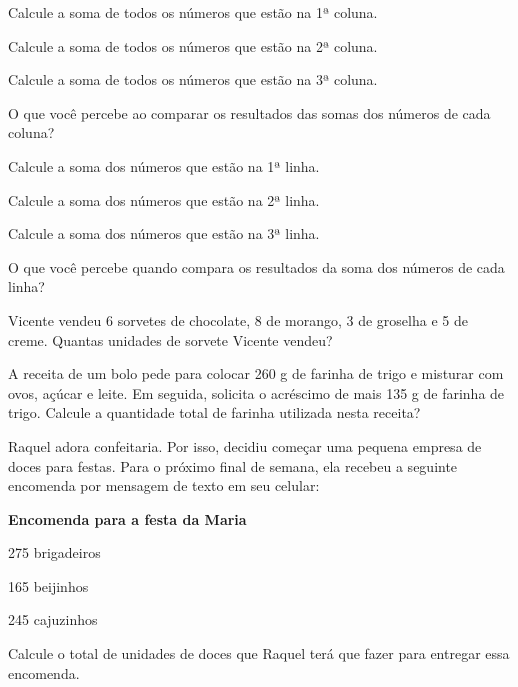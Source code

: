 {}

\startitemize
\item
  Calcule a soma de todos os números que estão na 1ª coluna.
\item
  Calcule a soma de todos os números que estão na 2ª coluna.
\item
  Calcule a soma de todos os números que estão na 3ª coluna.
\item
  O que você percebe ao comparar os resultados das somas dos números de
  cada coluna?
\item
  Calcule a soma dos números que estão na 1ª linha.
\item
  Calcule a soma dos números que estão na 2ª linha.
\item
  Calcule a soma dos números que estão na 3ª linha.
\item
  O que você percebe quando compara os resultados da soma dos números de
  cada linha?
\stopitemize

\subsubsubsection[reference={section-4}]

Vicente vendeu 6 sorvetes de chocolate, 8 de morango, 3 de groselha e 5
de creme. Quantas unidades de sorvete Vicente vendeu?

{}

\subsubsubsection[reference={section-5}]

A receita de um bolo pede para colocar 260 g de farinha de trigo e
misturar com ovos, açúcar e leite. Em seguida, solicita o acréscimo de
mais 135 g de farinha de trigo. Calcule a quantidade total de farinha
utilizada nesta receita?

{}

\subsubsubsection[reference={section-6}]

Raquel adora confeitaria. Por isso, decidiu começar uma pequena empresa
de doces para festas. Para o próximo final de semana, ela recebeu a
seguinte encomenda por mensagem de texto em seu celular:

{\bf Encomenda para a festa da Maria}

\startitemize
\item
  275 brigadeiros
\item
  165 beijinhos
\item
  245 cajuzinhos
\stopitemize

Calcule o total de unidades de doces que Raquel terá que fazer para
entregar essa encomenda.

\subsubsubsection[reference={section-7}]

